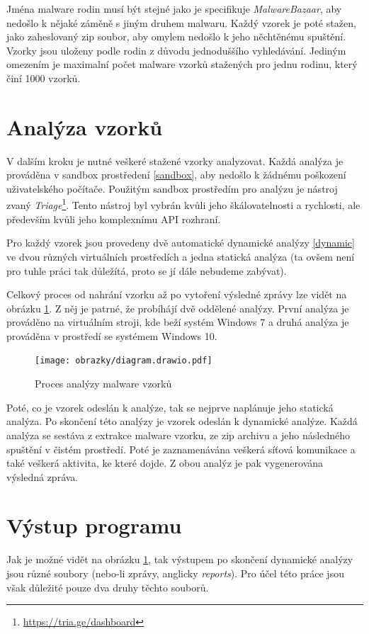 Jména malware rodin musí být stejné jako je specifikuje \textit{MalwareBazaar}, aby nedošlo k nějaké záměně s jiným druhem malwaru. Každý vzorek je poté stažen, jako zaheslovaný zip soubor, aby omylem nedošlo k 
jeho něchtěnému spuštění. Vzorky jsou uloženy podle rodin z důvodu jednoduššího vyhledávání. Jediným omezením je maximalní počet malware vzorků stažených pro jednu rodinu, který činí 1000 vzorků.

\section{Analýza vzorků}
V dalším kroku je nutné veškeré stažené vzorky analyzovat. Každá analýza je prováděna v sandbox prostředení \ref{sandbox}, aby nedošlo k žádnému poškození uživatelského počítače.
Použitým sandbox prostředím pro analýzu je nástroj zvaný \textit{Triage}\footnote{\href{https://tria.ge/dashboard}{https://tria.ge/dashboard}}. Tento nástroj byl vybrán kvůli jeho škálovatelnosti a rychlosti, 
ale především kvůli jeho komplexnímu API rozhraní.

Pro každý vzorek jsou provedeny dvě automatické dynamické analýzy \ref{dynamic} ve dvou různých virtuálních prostředích a jedna statická analýza (ta ovšem není pro tuhle práci tak důležítá, proto se jí dále nebudeme zabývat). 

Celkový proces od nahrání vzorku až po vytoření výsledné zprávy lze vidět na obrázku \ref{Analysis_diagram}. Z něj je patrné, že probíhájí dvě oddělené analýzy. První analýza je prováděno na virtuálním stroji, kde beží 
systém Windows 7 a druhá analýza je prováděna v prostředí se systémem Windows 10.

\begin{figure}[h]
	\centering
        \texttt{[image: obrazky/diagram.drawio.pdf]}
	\caption{Proces analýzy malware vzorků}
    \label{Analysis_diagram}
\end{figure}

Poté, co je vzorek odeslán k analýze, tak se nejprve naplánuje jeho statická analýza. Po skončení této analýzy je vzorek odeslán k dynamické analýze. Každá analýza se sestáva z extrakce malware vzorku, ze zip archivu a jeho následného spuštění v čistém prostředí. Poté je zaznamenávána veškerá síťová komunikace a také veškerá aktivita, ke které dojde.
Z obou analýz je pak vygenerována výsledná zpráva.
\section{Výstup programu}
Jak je možné vidět na obrázku \ref{Analysis_diagram}, tak výstupem po skončení dynamické analýzy jsou různé soubory (nebo-li zprávy, anglicky \textit{reports}). Pro účel této práce jsou však důležité pouze dva druhy těchto souborů.

